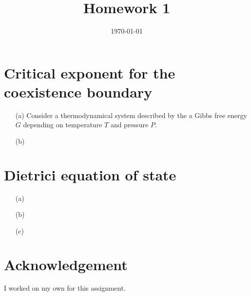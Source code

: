 \documentclass[10pt, a4paper]{article}
\title{Homework 1} %
\author{\PA} %
\date{\today} %
\begin{document}
\section{Critical exponent for the coexistence boundary}
\begin{enumerate}
  \item[(a)] Consider a thermodynamical system described by the a Gibbs free energy $G$ depending on temperature $T$ and pressure $P$. 
  \item[(b)]
\end{enumerate}

\section{Dietrici equation of state}
\begin{enumerate}
  \item[(a)]
  \item[(b)]
  \item[(c)]
\end{enumerate}

\maketitlepage

\maketableofcontents





\section{Acknowledgement}
I worked on my own for this assignment.


\makereferences


\end{document}
